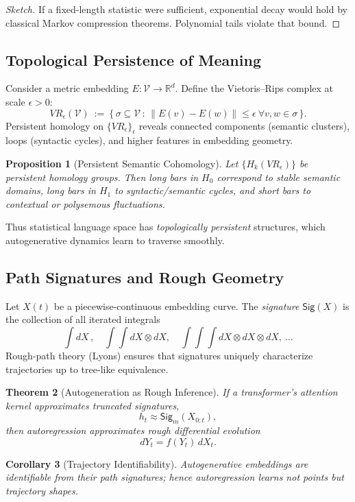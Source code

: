 \documentclass[12pt,a4paper,twoside,openright]{book}
\newtheorem{theorem}{Theorem}
\newtheorem{proposition}[theorem]{Proposition}
\newtheorem{corollary}[theorem]{Corollary}
\begin{document}
\begin{proof}[Sketch]
If a fixed-length statistic were sufficient, exponential decay would hold by classical Markov compression theorems.
Polynomial tails violate that bound.
\end{proof}

\subsection{Topological Persistence of Meaning}
Consider a metric embedding $E: \mathcal{V} \to \mathbb{R}^d$.
Define the Vietoris–Rips complex at scale $\epsilon>0$:
\[
VR_\epsilon(\mathcal{V}) \ :=\
\big\{\,\sigma\subseteq \mathcal{V}\,:\,\|E(v)-E(w)\|\le\epsilon \ \forall v,w\in \sigma\,\big\}.
\]
Persistent homology on $\{ VR_\epsilon \}_{\epsilon}$ reveals connected components (semantic clusters), loops (syntactic cycles), and higher features in embedding geometry.

\begin{proposition}[Persistent Semantic Cohomology]
Let $\{H_k(VR_\epsilon)\}$ be persistent homology groups.
Then long bars in $H_0$ correspond to stable semantic domains, long bars in $H_1$ to syntactic/semantic cycles, and short bars to contextual or polysemous fluctuations.
\end{proposition}
Thus statistical language space has \emph{topologically persistent} structures, which autogenerative dynamics learn to traverse smoothly.

\subsection{Path Signatures and Rough Geometry}
Let $X(t)$ be a piecewise-continuous embedding curve.
The \emph{signature} $\mathsf{Sig}(X)$ is the collection of all iterated integrals
\[
\int dX\,,\quad \int\!\!\int dX\otimes dX,\quad \int\!\!\int\!\!\int dX\otimes dX\otimes dX,\ \dots
\]
Rough-path theory (Lyons) ensures that signatures uniquely characterize trajectories up to tree-like equivalence.

\begin{theorem}[Autogeneration as Rough Inference]
If a transformer’s attention kernel approximates truncated signatures,
\[
h_t \approx \mathsf{Sig}_m(X_{0:t}),
\]
then autoregression approximates rough differential evolution
\[
dY_t = f(Y_t)\,dX_t.
\]
\end{theorem}

\begin{corollary}[Trajectory Identifiability]
Autogenerative embeddings are identifiable from their path signatures; hence autoregression learns not points but \emph{trajectory shapes}.
\end{corollary}
\end{document}
